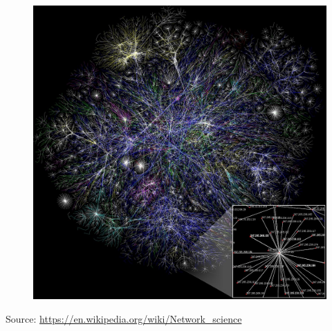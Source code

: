 \documentclass[aspectratio=169]{beamer}
\begin{document}
\begin{frame}
\begin{columns}
		\begin{column}{0.5\textwidth}
			\begin{figure}
				\centering
				\includegraphics[width=0.9\linewidth]{images/internet}
				\label{fig:internet}
			\end{figure}
			\tiny Source: \url{https://en.wikipedia.org/wiki/Network_science}
		\end{column}
		
	\end{columns}
	
\end{frame}
\end{document}
